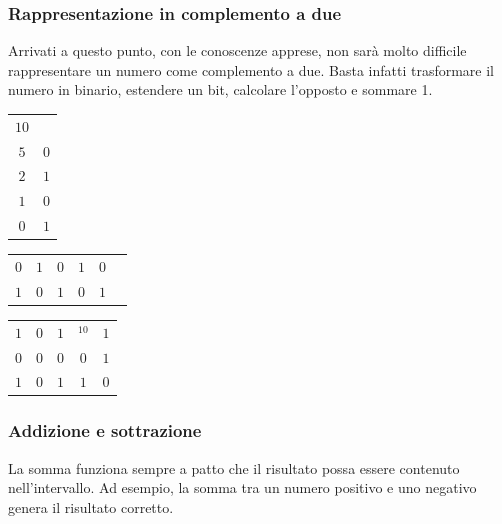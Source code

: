 \subsubsection*{Rappresentazione in complemento a due}
Arrivati a questo punto, con le conoscenze apprese, non sarà molto difficile rappresentare un numero come complemento a due. Basta infatti trasformare il numero in binario, estendere un bit, calcolare l'opposto e sommare 1.
\begin{center}
    \begin{tabular}{c|c}
    \centering
         $10$&\\
         $5$&$0$\\
         $2$&$1$\\
         $1$&$0$\\
         $0$&$1$\\
    \end{tabular}\hspace{0,5cm}
    \begin{tabular}{c c c c c c}
         $0$&$1$&$0$&$1$&$0$\\
         $1$&$0$&$1$&$0$&$1$
    \end{tabular}
    \hspace{0,5cm}
    \begin{tabular}{c c c c c}
         $1$&$0$&$1$&$^10$&$1$\\
         $0$&$0$&$0$&$0$&$1$\\\hline
         $1$&$0$&$1$&$1$&$0$\\
    \end{tabular}
\end{center}

\subsubsection*{Addizione e sottrazione}
La somma funziona sempre a patto che il risultato possa essere contenuto nell'intervallo. Ad esempio, la somma tra un numero positivo e uno negativo genera il risultato corretto.

